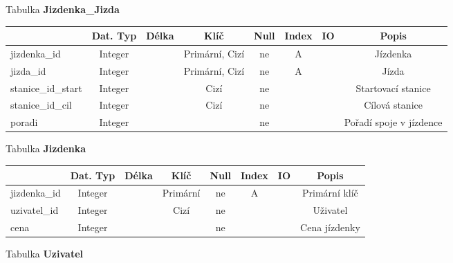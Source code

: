 \documentclass[11pt]{article}
\begin{document}
\noindent
Tabulka \textbf{Jizdenka\_Jizda}

\begin{table}[H]
    \begin{tabular}{|l|c|c|c|c|c|c|c|} \hline
                        & Dat. Typ  & Délka & Klíč              & Null  & Index & IO    & Popis \\ \hline
    jizdenka\_id        & Integer   &       & Primární, Cizí    & ne    & A     &       & Jízdenka \\ \hline
    jizda\_id           & Integer   &       & Primární, Cizí	& ne	& A     &       & Jízda \\ \hline
    stanice\_id\_start  & Integer   &       & Cizí              & ne    &       &       & Startovací stanice \\ \hline
    stanice\_id\_cil    & Integer   &       & Cizí              & ne    &       &       & Cílová stanice \\ \hline
    poradi              & Integer   &       &                   & ne    &       &       & Pořadí spoje v jízdence \\ \hline
    \end{tabular}
\end{table}

\noindent
Tabulka \textbf{Jizdenka}

\begin{table}[H]
    \begin{tabular}{|l|c|c|c|c|c|c|c|} \hline
                            & Dat. Typ  & Délka & Klíč      & Null  & Index & IO    & Popis \\ \hline
        jizdenka\_id	    & Integer	&	    & Primární	& ne	& A		&       & Primární klíč \\ \hline
        uzivatel\_id	    & Integer	&	    & Cizí	    & ne	&		&       & Uživatel \\ \hline
        cena	            & Integer	&	    & 	        & ne	&		&       & Cena jízdenky \\ \hline
    \end{tabular}
\end{table}

\newpage

\noindent
Tabulka \textbf{Uzivatel}
\end{document}
